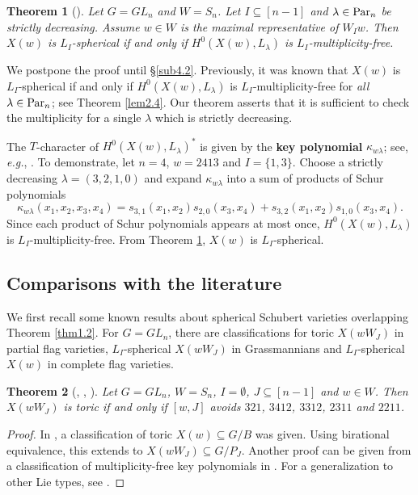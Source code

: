 \documentclass[12pt]{amsart}
\newtheorem{theorem}{Theorem}[section]
\theoremstyle{definition}
\theoremstyle{remark}
\newcommand{\Parn}{{\rm Par}_n}
\begin{document}
\begin{theorem}[{\cite[Conjecture 4.19]{MR4394321}}]\label{thm1.1}
Let $G=GL_n$ and $W = S_n$. Let $I \subseteq [n-1]$ and $\lambda \in \Parn$ be strictly decreasing. Assume $w \in W$ is the maximal representative of $W_Iw$. Then $X(w)$ is $L_I$-spherical if and only if $H^0(X(w) , L_\lambda)$ is $L_I$-multiplicity-free.
\end{theorem}

We postpone the proof until \S \ref{sub4.2}. Previously, it was known that $X(w)$ is $L_I$-spherical if and only if $H^0(X(w) , L_\lambda)$ is $L_I$-multiplicity-free for \textit{all} $\lambda \in \Parn$; see Theorem \ref{lem2.4}. Our theorem asserts that it is sufficient to check the multiplicity for a single $\lambda$ which is strictly decreasing.

The $T$-character of $H^0(X(w), L_\lambda)^*$ is given by the \textbf{key polynomial} $\kappa_{w\lambda}$; see, \textit{e.g.}, \cite[\S 4.4]{MR4394321}. To demonstrate, let $n=4$, $w = 2413$ and $I = \{1,3\}$. Choose a strictly decreasing $\lambda = (3,2,1,0)$ and expand $\kappa_{w\lambda}$ into a sum of products of Schur polynomials
\begin{equation}\label{eqn1.5}
\kappa_{w\lambda}(x_1 , x_2 , x_3 , x_4) = s_{3,1}(x_1 , x_2) s_{2,0}(x_3 , x_4) + s_{3,2}(x_1 , x_2) s_{1,0}(x_3 , x_4).
\end{equation}
Since each product of Schur polynomials appears at most once, $H^0 (X(w), L_\lambda)$ is $L_I$-multiplicity-free. From Theorem \ref{thm1.1}, $X(w)$ is $L_I$-spherical.



\subsection{Comparisons with the literature}\label{sub1.2}

We first recall some known results about spherical Schubert varieties overlapping Theorem \ref{thm1.2}. For $G= GL_n$, there are classifications for toric $X(wW_J)$ in partial flag varieties, $L_I$-spherical $X(wW_J)$ in Grassmannians and $L_I$-spherical $X(w)$ in complete flag varieties.

\begin{theorem}[{\cite{MR3044412}, \cite{MR4599567}, \cite{gao2024orbitstructurescomplexityschubert}}]\label{thm2.1}
Let $G = GL_n$, $W=S_n$, $I=\emptyset$, $J \subseteq [n-1]$ and $w \in W$. Then $X(wW_J)$ is toric if and only if $[w,J]$ avoids $321$, $3412$, $3312$, $2311$ and $2211$.
\end{theorem}
\begin{proof}
In \cite[Theorems 2 and 4]{MR3044412}, a classification of toric $X(w) \subseteq G/B$ was given. Using birational equivalence, this extends to $X(wW_J) \subseteq G/P_J$. Another proof can be given from a classification of multiplicity-free key polynomials in \cite[Theorem 1.1]{MR4599567}. For a generalization to other Lie types, see \cite[Corollary 4.12]{gao2024orbitstructurescomplexityschubert}.
\end{proof}
\end{document}
